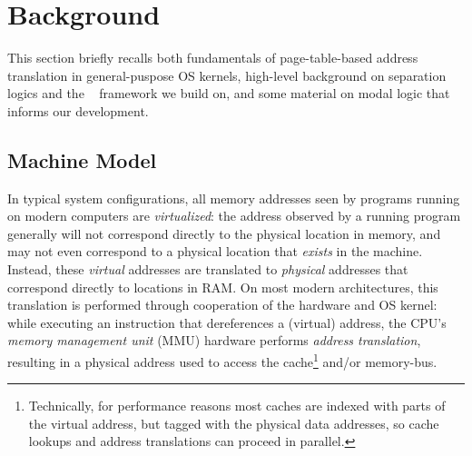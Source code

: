 \section{Background}
\label{sec:background}
This section briefly recalls both fundamentals of page-table-based address translation in
general-puspose OS kernels, 
high-level background on separation logics and the \iris~\cite{jung2018iris} framework
we build on,
and some material on modal logic that informs our development.

\subsection{Machine Model}
\label{sec:backgroundonmachinemodel}

In typical system configurations, all memory addresses seen by programs running on modern computers are \emph{virtualized}: the address observed by a running
program generally will not correspond directly to the physical location in memory, and may not even correspond to a physical location that \emph{exists} 
in the machine. Instead, these \emph{virtual} addresses are translated to \emph{physical} addresses that correspond directly to locations in RAM. On most 
modern architectures, this translation is performed through cooperation of the hardware and OS kernel: while executing an instruction that dereferences a 
(virtual) address, the CPU's \emph{memory management unit} (\textsc{MMU}) hardware performs \emph{address translation},
resulting in a physical address used to access the cache\footnote{Technically, for performance reasons most caches are indexed with parts of the virtual 
address, but tagged with the physical data addresses, so cache lookups and address translations can proceed in parallel.} and/or memory-bus.

